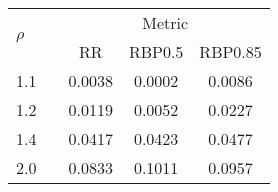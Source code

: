 \renewcommand{\tabcolsep}{0.5em}
\begin{tabular}{l c ccc}
\toprule
\multirow{2}{*}{$\rho$}
	&& \multicolumn{3}{c}{Metric}
\\
\cmidrule{3-5}
	&& RR
		& RBP0.5
			& RBP0.85
\\
\midrule
1.1
	&& 0.0038
		& 0.0002
			& 0.0086
\\
1.2
	&& 0.0119
		& 0.0052
			& 0.0227
\\
1.4
	&& 0.0417
		& 0.0423
			& 0.0477
\\
2.0
	&& 0.0833
		& 0.1011
			& 0.0957
\\
\bottomrule
\end{tabular}
